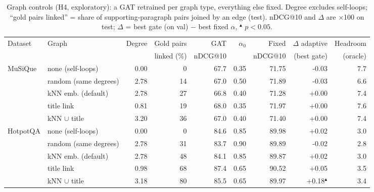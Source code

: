 \begin{table}[t]
\centering\small\setlength{\tabcolsep}{4pt}
\begin{tabular}{llrrrrrrr}
\toprule
Dataset & Graph & Degree & Gold pairs & GAT & $\alpha_0$ & Fixed & $\Delta$ adaptive & Headroom \\
 & & & linked (\%) & nDCG@10 & & nDCG@10 & (best gate) & (oracle) \\
\midrule
MuSiQue & none (self-loops) & 0.00 & 0 & 67.7 & 0.35 & 71.75 & -0.03 & 7.7 \\
 & random (same degrees) & 2.78 & 14 & 67.0 & 0.50 & 71.89 & -0.03 & 6.6 \\
 & kNN emb. (default) & 2.78 & 27 & 66.8 & 0.40 & 71.28 & +0.00 & 7.4 \\
 & title link & 0.81 & 19 & 68.0 & 0.35 & 71.97 & +0.00 & 7.6 \\
 & kNN $\cup$ title & 3.20 & 36 & 67.0 & 0.40 & 71.40 & +0.00 & 7.4 \\
\midrule
HotpotQA & none (self-loops) & 0.00 & 0 & 84.6 & 0.85 & 89.98 & +0.02 & 3.0 \\
 & random (same degrees) & 2.78 & 31 & 83.7 & 0.90 & 89.89 & -0.02 & 2.8 \\
 & kNN emb. (default) & 2.78 & 48 & 84.1 & 0.85 & 89.87 & +0.02 & 3.0 \\
 & title link & 0.98 & 68 & 87.4 & 0.65 & 90.52 & +0.05 & 3.5 \\
 & kNN $\cup$ title & 3.18 & 80 & 85.5 & 0.65 & 89.97 & +0.18$^{\blacktriangle}$ & 3.4 \\
\bottomrule
\end{tabular}
\caption{Graph controls (H4, exploratory): a GAT retrained per graph type, everything else fixed. Degree excludes self-loops; ``gold pairs linked'' = share of supporting-paragraph pairs joined by an edge (test). nDCG@10 and $\Delta$ are $\times$100 on test; $\Delta$ = best gate (on val) $-$ best fixed $\alpha$, $^{\blacktriangle}$ $p<0.05$.}
\label{tab:graph}
\end{table}
